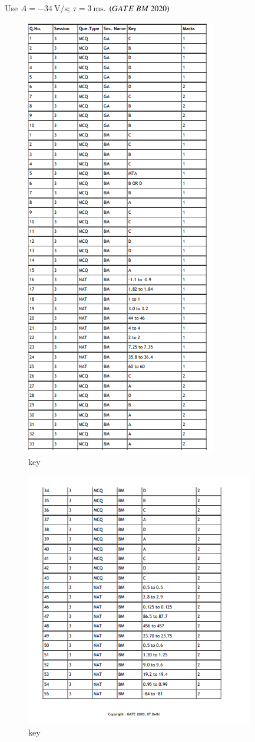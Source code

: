 \documentclass[journal,12pt,onecolumn]{IEEEtran}
\theoremstyle{remark}
\begin{document}
\begin{enumerate}
Use $A = -34 \ \text{V/s}$; $\tau = 3 \ \text{ms}$.  \hfill $\left(GATE\ BM\ 2020\right)$

\newpage
{}

\begin{figure}[H]
\centering
\includegraphics[width=0.4\columnwidth]{Figs/fig8.png}
\caption{key}
\label{fig:placeholder}
\end{figure}

\begin{figure}[H]
\centering
\includegraphics[width=0.4\columnwidth]{Figs/fig9.png}
\caption{key}
\label{fig:placeholder}
\end{figure}




\end{enumerate}
\end{document}

